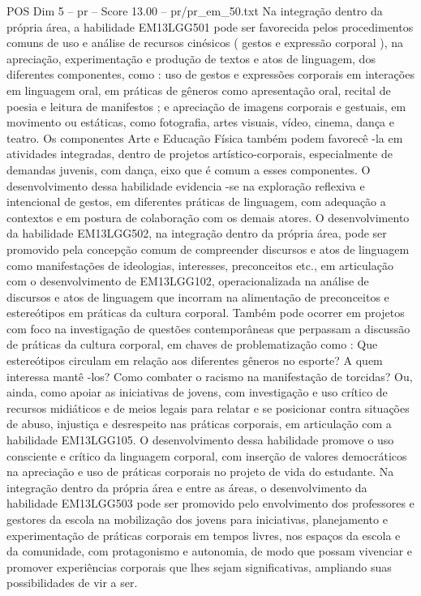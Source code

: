 \begin{textsample}{POS Dim 5 – pr – Score 13.00 – pr/pr\_em\_50.txt}
Na integração dentro da própria área, a habilidade EM13LGG501 pode ser favorecida pelos procedimentos comuns de uso e análise de recursos cinésicos ( gestos e expressão corporal ), na apreciação, experimentação e produção de textos e atos de linguagem, dos diferentes componentes, como : uso de gestos e expressões corporais em interações em linguagem oral, em práticas de gêneros como apresentação oral, recital de poesia e leitura de manifestos ; e apreciação de imagens corporais e gestuais, em movimento ou estáticas, como fotografia, artes visuais, vídeo, cinema, dança e teatro.
Os componentes Arte e Educação Física também podem favorecê -la em atividades integradas, dentro de projetos artístico-corporais, especialmente de demandas juvenis, com dança, eixo que é comum a esses componentes.
O desenvolvimento dessa habilidade evidencia -se na exploração reflexiva e intencional de gestos, em diferentes práticas de linguagem, com adequação a contextos e em postura de colaboração com os demais atores.
O desenvolvimento da habilidade EM13LGG502, na integração dentro da própria área, pode ser promovido pela concepção comum de compreender discursos e atos de linguagem como manifestações de ideologias, interesses, preconceitos etc., em articulação com o desenvolvimento de EM13LGG102, operacionalizada na análise de discursos e atos de linguagem que incorram na alimentação de preconceitos e estereótipos em práticas da cultura corporal.
Também pode ocorrer em projetos com foco na investigação de questões contemporâneas que perpassam a discussão de práticas da cultura corporal, em chaves de problematização como : Que estereótipos circulam em relação aos diferentes gêneros no esporte?
A quem interessa mantê -los?
Como combater o racismo na manifestação de torcidas?
Ou, ainda, como apoiar as iniciativas de jovens, com investigação e uso crítico de recursos midiáticos e de meios legais para relatar e se posicionar contra situações de abuso, injustiça e desrespeito nas práticas corporais, em articulação com a habilidade EM13LGG105.
O desenvolvimento dessa habilidade promove o uso consciente e crítico da linguagem corporal, com inserção de valores democráticos na apreciação e uso de práticas corporais no projeto de vida do estudante.
Na integração dentro da própria área e entre as áreas, o desenvolvimento da habilidade EM13LGG503 pode ser promovido pelo envolvimento dos professores e gestores da escola na mobilização dos jovens para iniciativas, planejamento e experimentação de práticas corporais em tempos livres, nos espaços da escola e da comunidade, com protagonismo e autonomia, de modo que possam vivenciar e promover experiências corporais que lhes sejam significativas, ampliando suas possibilidades de vir a ser.

\end{textsample}
